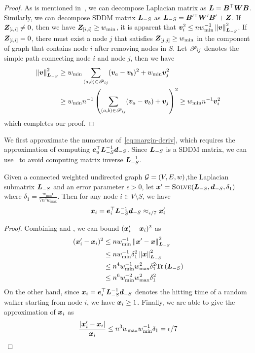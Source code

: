 \documentclass[sigconf]{acmart}
\begin{document}
\begin{proof}
    As is mentioned in~, we can decompose Laplacian matrix as \(\boldsymbol{L}=\boldsymbol{B}^\top\boldsymbol{W}\boldsymbol{B}\).
    Similarly, we can decompose SDDM matrix \(\boldsymbol{L}_{-S}\) as \(\boldsymbol{L}_{-S}=\boldsymbol{B}'^\top\boldsymbol{W}'\boldsymbol{B}'+\boldsymbol{Z}\).
    If \(\boldsymbol{Z}_{[i,i]}\neq0\), then we have \(\boldsymbol{Z}_{[i,i]}\ge w_{\min}\), it is apparent that \(\boldsymbol{v}_i^2\le nw_{\min}^{-1}\left\Vert\boldsymbol{v}\right\Vert^2_{\boldsymbol{L}_{-S}}\).
    If \(\boldsymbol{Z}_{[i,i]}=0\), there must exist a node \(j\) that satisfies \(\boldsymbol{Z}_{[j,j]}\ge w_{\min}\) in the component of graph that contains node \(i\) after removing nodes in \(S\).
    Let \(\mathscr{P}_{ij}\) denotes the simple path connecting node \(i\) and node \(j\), then we have
    \begin{align*}
        \left\Vert\boldsymbol{v}\right\Vert^2_{\boldsymbol{L}_{-S}}
         & \ge w_{\min}\sum_{(a,b)\in\mathscr{P}_{ij}}(\boldsymbol{v}_a-\boldsymbol{v}_b)^2+w_{\min}\boldsymbol{v}_j^2           \\
         & \ge w_{\min}n^{-1}\left(\sum_{(a,b)\in\mathscr{P}_{ij}}(\boldsymbol{v}_a-\boldsymbol{v}_b)+\boldsymbol{v}_j \right)^2
        \ge w_{\min}n^{-1}\boldsymbol{v}_i^2
    \end{align*}
    which completes our proof.
\end{proof}

We first approximate the numerator of~\eqref{eq:margin-deriv}, which requires the approximation of computing \(\boldsymbol{e}_u^\top\boldsymbol{L}_{-S}^{-1}\boldsymbol{d}_{-S}\).
Since \(\boldsymbol{L}_{-S}\) is a SDDM matrix, we can use~ to avoid computing matrix inverse \(\boldsymbol{L}_{-S}^{-1}\).
\begin{lemma}\label{lem:approx-numer}
    Given a connected weighted undirected graph \(\mathcal{G}=(V,E,w)\),the Laplacian submatrix \(\boldsymbol{L}_{-S}\) and an error parameter \(\epsilon>0\), let \(\boldsymbol{x}'=\textsc{Solve}(\boldsymbol{L}_{-S},\boldsymbol{d}_{-S},\delta_1)\) where \(\delta_1=\frac{w_{\min}\epsilon}{7n^3w_{\max}}\). Then for any node \(i\in V\setminus S\), we have
    \begin{equation}\label{eq:approx-numer}
        \boldsymbol{x}_i=\boldsymbol{e}_i^\top\boldsymbol{L}_{-S}^{-1}\boldsymbol{d}_{-S}\approx_{\epsilon/7}\boldsymbol{x}'_i
    \end{equation}
\end{lemma}
\begin{proof}

    Combining  and , we can bound \((\boldsymbol{x}'_i-\boldsymbol{x}_i)^2\) as
    \begin{align*}
        (\boldsymbol{x}'_i-\boldsymbol{x}_i)^2
         & \le nw_{\min}^{-1}\left\Vert\boldsymbol{x}'-\boldsymbol{x}\right\Vert^2_{\boldsymbol{L}_{-S}}        \\
         & \le nw_{\min}^{-1}\delta_1^2\left\Vert\boldsymbol{x}\right\Vert^2_{\boldsymbol{L}_{-S}}     \\
         & \le n^4w_{\min}^{-1}w_{\max}^2\delta_1^2\mathrm{Tr}\left(\boldsymbol{L}_{-S}\right) \\
         & \le n^6w_{\min}^{-2}w_{\max}^2\delta_1^2
    \end{align*}
    On the other hand, since \(\boldsymbol{x}_i=\boldsymbol{e}_i^\top\boldsymbol{L}_{-S}^{-1}\boldsymbol{d}_{-S}\) denotes the hitting time of a random walker starting from node \(i\), we have \(\boldsymbol{x}_i\ge1\).
    Finally, we are able to give the approximation of \(\boldsymbol{x}_i\) as
    \[\frac{\left|\boldsymbol{x}'_i-\boldsymbol{x}_i \right|}{\boldsymbol{x}_i}\le n^3w_{\max}w_{\min}^{-1}\delta_1=\epsilon/7\]
\end{proof}
\end{document}
